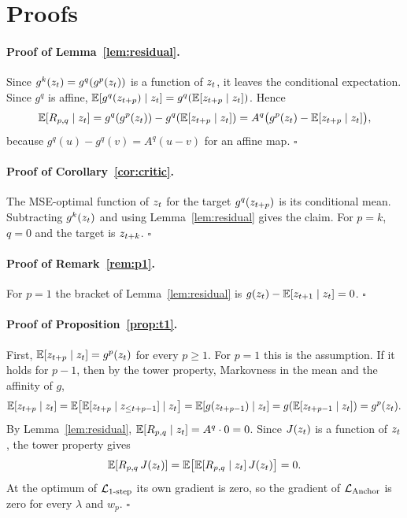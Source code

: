 \section{Proofs}
\label{app:proofs}

\paragraph{Proof of Lemma~\ref{lem:residual}.}
Since $g^{k}(z_{t}) = g^{q}(g^{p}(z_{t}))$ is a function of $z_{t}$, it leaves the conditional expectation. Since $g^{q}$ is affine, $\mathbb{E}[g^{q}(z_{t+p}) \mid z_{t}] = g^{q}(\mathbb{E}[z_{t+p} \mid z_{t}])$. Hence
\[
  \mathbb{E}[R_{p,q} \mid z_{t}] = g^{q}(g^{p}(z_{t})) - g^{q}(\mathbb{E}[z_{t+p} \mid z_{t}]) = A^{q}\big(g^{p}(z_{t}) - \mathbb{E}[z_{t+p} \mid z_{t}]\big),
\]
because $g^{q}(u) - g^{q}(v) = A^{q}(u - v)$ for an affine map. \hfill$\square$

\paragraph{Proof of Corollary~\ref{cor:critic}.}
The MSE-optimal function of $z_{t}$ for the target $g^{q}(z_{t+p})$ is its conditional mean. Subtracting $g^{k}(z_{t})$ and using Lemma~\ref{lem:residual} gives the claim. For $p = k$, $q = 0$ and the target is $z_{t+k}$. \hfill$\square$

\paragraph{Proof of Remark~\ref{rem:p1}.}
For $p = 1$ the bracket of Lemma~\ref{lem:residual} is $g(z_{t}) - \mathbb{E}[z_{t+1} \mid z_{t}] = 0$. \hfill$\square$

\paragraph{Proof of Proposition~\ref{prop:t1}.}
First, $\mathbb{E}[z_{t+p} \mid z_{t}] = g^{p}(z_{t})$ for every $p \ge 1$. For $p = 1$ this is the assumption. If it holds for $p - 1$, then by the tower property, Markovness in the mean and the affinity of $g$,
\[
  \mathbb{E}[z_{t+p} \mid z_{t}]
  = \mathbb{E}\big[\mathbb{E}[z_{t+p} \mid z_{\le t+p-1}] \mid z_{t}\big]
  = \mathbb{E}[g(z_{t+p-1}) \mid z_{t}]
  = g(\mathbb{E}[z_{t+p-1} \mid z_{t}])
  = g^{p}(z_{t}).
\]
By Lemma~\ref{lem:residual}, $\mathbb{E}[R_{p,q} \mid z_{t}] = A^{q} \cdot 0 = 0$. Since $J(z_{t})$ is a function of $z_{t}$, the tower property gives
\[
  \mathbb{E}[R_{p,q} \, J(z_{t})] = \mathbb{E}\big[\mathbb{E}[R_{p,q} \mid z_{t}] \, J(z_{t})\big] = 0 .
\]
At the optimum of $\mathcal{L}_{\text{1-step}}$ its own gradient is zero, so the gradient of $\mathcal{L}_{\text{Anchor}}$ is zero for every $\lambda$ and $w_p$. \hfill$\square$

